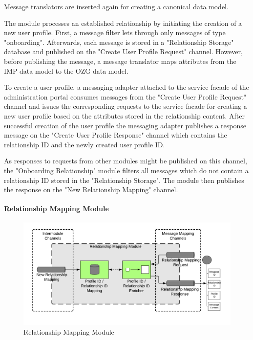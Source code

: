 Message translators are inserted again for creating a canonical data model.

The module processes an established relationship by initiating the creation of a new user profile. First, a message filter lets through only messages of type "onboarding". Afterwards, each message is stored in a "Relationship Storage" database and published on the "Create User Profile Request" channel. However, before publishing the message, a message translator maps attributes from the IMP data model to the OZG data model.

To create a user profile, a messaging adapter attached to the service facade of the administration portal consumes messages from the "Create User Profile Request" channel and issues the corresponding requests to the service facade for creating a new user profile based on the attributes stored in the relationship content. After successful creation of the user profile the messaging adapter publishes a response message on the "Create User Profile Response" channel which contains the relationship ID and the newly created user profile ID.

As responses to requests from other modules might be published on this channel, the "Onboarding Relationship" module filters all messages which do not contain a relationship ID stored in the "Relationship Storage". The module then publishes the response on the "New Relationship Mapping" channel.

\paragraph{Relationship Mapping Module}

\begin{figure}[h!]
    \centering
    \includegraphics[scale=0.6]{Diagrams/Integration Architecture 1/Technological Integration/9. Relationship Mapping.pdf}
    \caption{Relationship Mapping Module}
    \label{integration1:relationship_mapping_module}
\end{figure}

